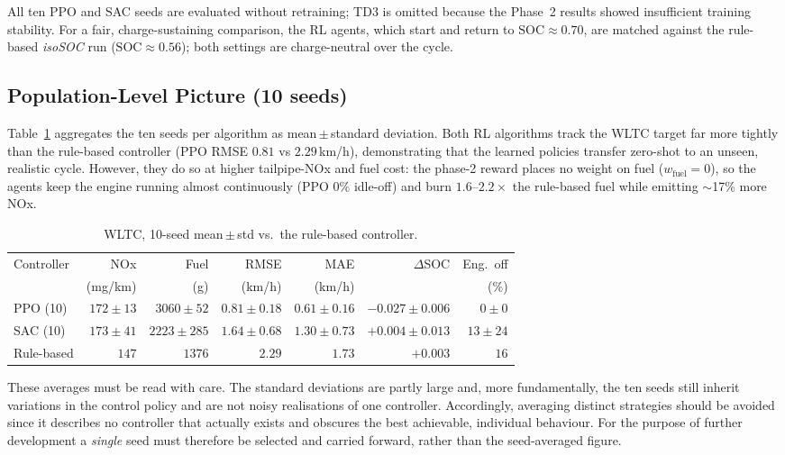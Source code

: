 All ten PPO and SAC seeds are evaluated without retraining; TD3 is omitted because the Phase~2 results showed insufficient training stability. For a fair, charge-sustaining comparison, the \ac{RL} agents, which start and return to $\mathrm{SOC}\approx0.70$, are matched against the rule-based \emph{isoSOC} run ($\mathrm{SOC}\approx0.56$); both settings are charge-neutral over the cycle.

\subsection{Population-Level Picture (10 seeds)}

Table~\ref{tab:wltc-mean} aggregates the ten seeds per algorithm as
mean\,$\pm$\,standard deviation. Both RL algorithms track the WLTC target far
more tightly than the rule-based controller (PPO RMSE $0.81$ vs $2.29$\,km/h),
demonstrating that the learned policies transfer zero-shot to an unseen, realistic
cycle. However, they do so at higher tailpipe-NOx and fuel cost: the
phase-2 reward places no weight on fuel ($w_\text{fuel}=0$), so the agents keep
the engine running almost continuously (PPO $0\%$ idle-off) and burn
$1.6$--$2.2\times$ the rule-based fuel while emitting $\sim$17\% more NOx.

\begin{table}[H]
  \centering
  \small
  \begin{tabular}{lrrrrrr}
    \toprule
    Controller & NOx & Fuel & RMSE & MAE & $\Delta$SOC & Eng.\ off \\
    & (mg/km) & (g) & (km/h) & (km/h) & & (\%) \\
    \midrule
    PPO (10)   & $172\pm13$ & $3060\pm52$  & $0.81\pm0.18$ & $0.61\pm0.16$ & $-0.027\pm0.006$ & $0\pm0$  \\
    SAC (10)   & $173\pm41$ & $2223\pm285$ & $1.64\pm0.68$ & $1.30\pm0.73$ & $+0.004\pm0.013$ & $13\pm24$ \\
    Rule-based & $147$      & $1376$       & $2.29$        & $1.73$        & $+0.003$         & $16$ \\
    \bottomrule
  \end{tabular}
  \caption[WLTC 10-seed mean comparison]{WLTC, 10-seed mean\,$\pm$\,std vs.\ the rule-based controller.}
  \label{tab:wltc-mean}
\end{table}

These averages must be read with care. The standard deviations are partly large and, more fundamentally, the ten seeds still inherit variations in the control policy and are not noisy realisations of one controller. Accordingly, averaging distinct strategies should be avoided since it describes no controller that actually exists and obscures the best achievable, individual behaviour. For the purpose of further development a \emph{single} seed must therefore be selected and carried forward, rather than the seed-averaged figure.


